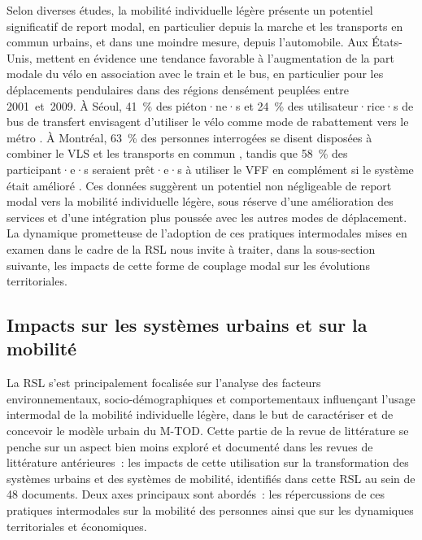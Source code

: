 \begin{refsegment}
Selon diverses études, la mobilité individuelle légère présente un potentiel significatif de report modal, en particulier depuis la marche et les transports en commun urbains, et dans une moindre mesure, depuis l'automobile. Aux États-Unis, \textcolor{blue}{\textcite[106]{wang_bicycle-transit_2013}} mettent en évidence une tendance favorable à l'augmentation de la part modale du vélo en association avec le train et le bus, en particulier pour les déplacements pendulaires dans des régions densément peuplées entre 2001~et~2009. À Séoul, 41~\% des piéton·ne·s et 24~\% des utilisateur·rice·s de bus de transfert envisagent d'utiliser le vélo comme mode de rabattement vers le métro \textcolor{blue}{\autocite[982]{lee_bicycle-based_2016}}. À Montréal, 63~\% des personnes interrogées se disent disposées à combiner le \acrshort{VLS} et les transports en commun \textcolor{blue}{\autocite[111]{bachand-marleau_much-anticipated_2011}}, tandis que 58~\% des participant·e·s seraient prêt·e·s à utiliser le \acrshort{VFF} en complément si le système était amélioré \textcolor{blue}{\autocite[12]{fan_how_2019}}. Ces données suggèrent un potentiel non négligeable de report modal vers la mobilité individuelle légère, sous réserve d'une amélioration des services et d'une intégration plus poussée avec les autres modes de déplacement. La dynamique prometteuse de l'adoption de ces pratiques intermodales mises en examen dans le cadre de la \acrshort{RSL} nous invite à traiter, dans la sous-section suivante, les impacts de cette forme de couplage modal sur les évolutions territoriales.%

\subsection{Impacts sur les systèmes urbains et sur la mobilité
    \label{chap2:impacts-systemes-urbain-mobilite}
    }
    
La \acrshort{RSL} s'est principalement focalisée sur l'analyse des facteurs environnementaux, socio-démographiques et comportementaux influençant l'usage intermodal de la mobilité individuelle légère, dans le but de caractériser et de concevoir le modèle urbain du \acrshort{M-TOD}. Cette partie de la revue de littérature se penche sur un aspect bien moins exploré et documenté dans les revues de littérature antérieures~: les impacts de cette utilisation sur la transformation des systèmes urbains et des systèmes de mobilité, identifiés dans cette \acrshort{RSL} au sein de 48 documents. Deux axes principaux sont abordés~: les répercussions de ces pratiques intermodales sur la mobilité des personnes ainsi que sur les dynamiques territoriales et économiques.%


\end{refsegment}
